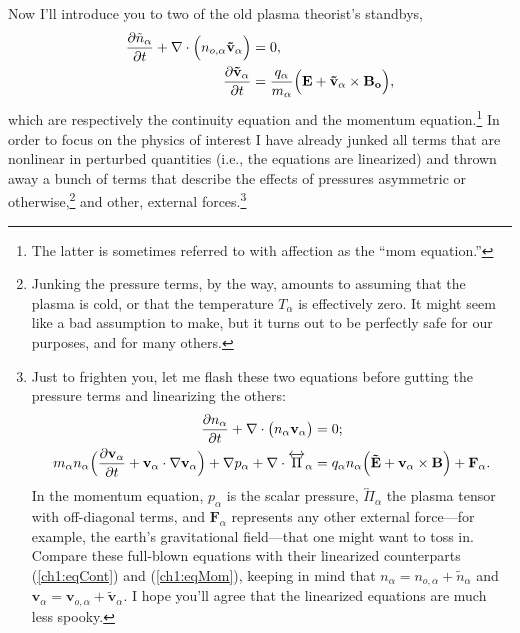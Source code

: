 Now I'll introduce you to two of the old plasma theorist's standbys,
\begin{subequations}
  \begin{align} 
    \dfrac{\partial \tilde n_{\alpha}}{\partial t} + {\bf \nabla} \cdot \Big (n_{o,\alpha} \mathbf{\tilde v}_{\alpha} \Big ) &= 0, \label{ch1:eqCont} \\
    \dfrac{\partial \mathbf{\tilde v}_{\alpha}}{\partial t} &=
    \dfrac{q_{\alpha}}{m_{\alpha}} \Big ( \mathbf{E} + \mathbf{\tilde
      v}_{\alpha} \times \mathbf{B_o} \Big ), \label{ch1:eqMom}
  \end{align}
\end{subequations}
which are respectively the continuity equation and the momentum
equation.\footnote{The latter is sometimes referred to with affection as the
  ``mom equation.''} In order to focus on the physics of interest I have already
junked all terms that are nonlinear in perturbed quantities (i.e., the equations
are linearized) and thrown away a bunch of terms that describe the effects of
pressures asymmetric or otherwise,\footnote{Junking the pressure terms, by the
  way, amounts to assuming that the plasma is cold, or that the temperature
  $T_\alpha$ is effectively zero. It might seem like a bad assumption to make,
  but it turns out to be perfectly safe for our purposes, and for many others.}
and other, external forces.\footnote{Just to frighten you, let me flash these
  two equations before gutting the pressure terms and linearizing the others:
\begin{equation*}
  \begin{aligned} 
    \dfrac{\partial n_{\alpha}}{\partial t} + {\bf \nabla} \cdot \big (n_{\alpha} \mathbf{v}_{\alpha} \big ) &= 0; \\
    m_{\alpha} n_{\alpha} \Big ( \dfrac{\partial \mathbf{v}_{\alpha}}{\partial
      t} + \mathbf{v}_{\alpha} \cdot {\bf \nabla} \mathbf{v}_{\alpha} \Big ) + {\bf \nabla}
    p_{\alpha} + {\bf \nabla} \cdot \overleftrightarrow{\Pi}_{\alpha} &= q_{\alpha}
    n_{\alpha} \Big ( \mathbf{\tilde E} + \mathbf{v}_{\alpha} \times \mathbf{B} \Big )
    + \mathbf{F}_{\alpha}.
  \end{aligned}
\end{equation*}
In the momentum equation, $p_\alpha$ is the scalar pressure,
$\overleftrightarrow{\Pi}_{\alpha}$ the plasma tensor with off-diagonal terms,
and $\mathbf{F}_\alpha$ represents any other external force---for example, the
earth's gravitational field---that one might want to toss in. Compare these
full-blown equations with their linearized counterparts (\ref{ch1:eqCont}) and
(\ref{ch1:eqMom}), keeping in mind that $n_\alpha = n_{o,\alpha} + \tilde
n_\alpha$ and $\mathbf{v}_\alpha = \mathbf{v}_{o,\alpha} + \mathbf{\tilde
  v}_\alpha$. I hope you'll agree that the linearized equations are much less
spooky.}

